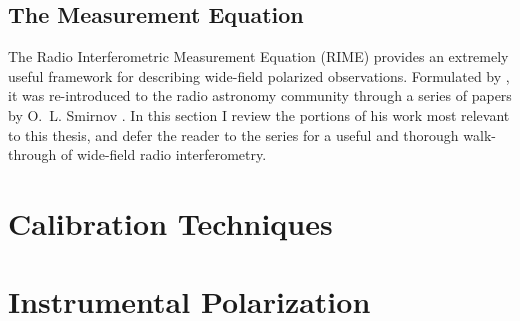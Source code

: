 \subsection{The Measurement Equation}

The Radio Interferometric Measurement Equation (RIME) provides an extremely useful framework for describing wide-field polarized observations. Formulated by \cite{HBS.1.96}, it was re-introduced to the radio astronomy community through a series of papers by O.~L. Smirnov \citep{Smirnov.11, Smirnov.11.2, Smirnov.11.3, Smirnov.11.4}. In this section I review the portions of his work most relevant to this thesis, and defer the reader to the series for a useful and thorough walk-through of wide-field radio interferometry.


\section{Calibration Techniques}
\label{sec:interferometry_cal}


\section{Instrumental Polarization}
\label{sec:interferometry_pol}

